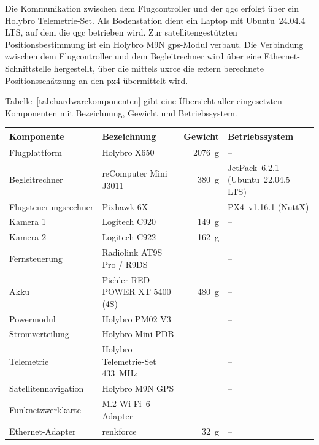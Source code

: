 Die Kommunikation zwischen dem Flugcontroller und der \gls{qgc} erfolgt über ein Holybro Tele\-metrie-\-Set.
Als Bodenstation dient ein Laptop mit Ubuntu~24.04.4 LTS, auf dem die \gls{qgc} betrieben wird.
Zur satellitengestützten Positionsbestimmung ist ein Holybro M9N \gls{gps}-Modul verbaut.
Die Verbindung zwischen dem Flugcontroller und dem Begleitrechner 
wird über eine Ethernet-Schnittstelle hergestellt, über die mittels \gls{uxrce} die extern berechnete Positionsschätzung an den \gls{px4} übermittelt wird.


Tabelle~\ref{tab:hardwarekomponenten} gibt eine Übersicht aller eingesetzten
Komponenten mit Bezeichnung, Gewicht und Betriebssystem.
\begin{table}[htbp]
\centering
\footnotesize
\begin{threeparttable}
\begin{tabularx}{\textwidth}{@{}l l r X@{}}
\toprule
\textbf{Komponente} & \textbf{Bezeichnung} & \textbf{Gewicht} & \textbf{Betriebssystem} \\
\midrule
Flugplattform        & Holybro X650                    & 2076~g   & -- \\
Begleitrechner       & reComputer Mini J3011           & 380~g    & JetPack~6.2.1 (Ubuntu~22.04.5 LTS) \\
Flugsteuerungsrechner & Pixhawk 6X                     & \tnote{*}   & PX4~v1.16.1 (NuttX) \\
Kamera 1             & Logitech C920                   & 149~g    & -- \\
Kamera 2             & Logitech C922                   & 162~g    & -- \\
Fernsteuerung        & Radiolink AT9S Pro / R9DS       & \tnote{*}   & -- \\
Akku                 & Pichler RED POWER XT 5400 (4S)  & 480~g    & -- \\
Powermodul           & Holybro PM02 V3                 & \tnote{*}   & -- \\
Stromverteilung      & Holybro Mini-PDB                & \tnote{*}   & -- \\
Telemetrie           & Holybro Telemetrie-Set 433~MHz & \tnote{*}   & -- \\
Satellitennavigation & Holybro M9N GPS                 & \tnote{*}   & -- \\
Funknetzwerkkarte    & M.2 Wi-Fi~6 Adapter             & \tnote{**}  & -- \\
Ethernet-Adapter     & renkforce                       & 32~g     & -- \\

\end{tabularx}
\end{threeparttable}
\end{table}
